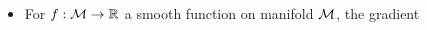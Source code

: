 \documentclass[11pt]{article}
\begin{document}
\begin{itemize}
%
%
%

\item For $f: {\mathcal M} \rightarrow {\mathbb R}$ a smooth function on manifold ${\mathcal M}$, the gradient 

\end{itemize}
\end{document}
